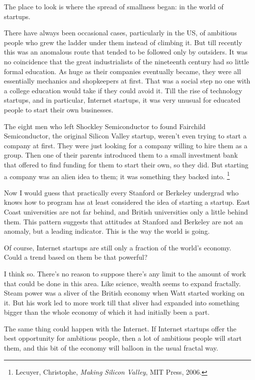 \documentclass[12pt]{book}
\begin{document}
The place to look is where the spread of smallness began: in the world
of startups.

There have always been occasional cases, particularly in the US, of
ambitious people who grew the ladder under them instead of climbing it.
But till recently this was an anomalous route that tended to be followed
only by outsiders. It was no coincidence that the great industrialists
of the nineteenth century had so little formal education. As huge as
their companies eventually became, they were all essentially mechanics
and shopkeepers at first. That was a social step no one with a college
education would take if they could avoid it. Till the rise of technology
startups, and in particular, Internet startups, it was very unusual for
educated people to start their own businesses.

The eight men who left Shockley Semiconductor to found Fairchild
Semiconductor, the original Silicon Valley startup, weren't even trying
to start a company at first. They were just looking for a company
willing to hire them as a group. Then one of their parents introduced
them to a small investment bank that offered to find funding for them to
start their own, so they did. But starting a company was an alien idea
to them; it was something they backed into. \footnote{Lecuyer, Christophe, \emph{Making Silicon Valley}, MIT Press,
2006.}

Now I would guess that practically every Stanford or Berkeley undergrad
who knows how to program has at least considered the idea of starting a
startup. East Coast universities are not far behind, and British
universities only a little behind them. This pattern suggests that
attitudes at Stanford and Berkeley are not an anomaly, but a leading
indicator. This is the way the world is going.

Of course, Internet startups are still only a fraction of the world's
economy. Could a trend based on them be that powerful?

I think so. There's no reason to suppose there's any limit to the amount
of work that could be done in this area. Like science, wealth seems to
expand fractally. Steam power was a sliver of the British economy when
Watt started working on it. But his work led to more work till that
sliver had expanded into something bigger than the whole economy of
which it had initially been a part.

The same thing could happen with the Internet. If Internet startups
offer the best opportunity for ambitious people, then a lot of ambitious
people will start them, and this bit of the economy will balloon in the
usual fractal way.
\end{document}

